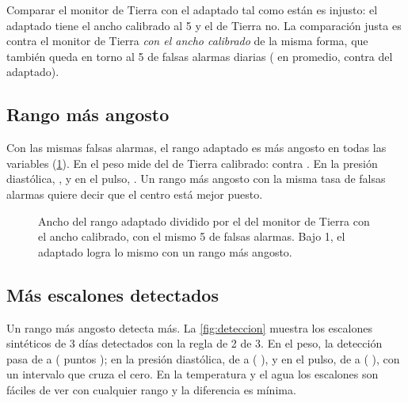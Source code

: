 Comparar el monitor de Tierra con el adaptado tal como están es injusto: el adaptado tiene el ancho calibrado al
5\pct{} y el de Tierra no. La comparación justa es contra el monitor de Tierra \emph{con el ancho calibrado} de la
misma forma, que también queda en torno al 5\pct{} de falsas alarmas diarias (\pct{} en
promedio, contra \pct{} del adaptado).

\subsection{Rango más angosto}

Con las mismas falsas alarmas, el rango adaptado es más angosto en todas las variables (\cref{fig:ancho}). En el peso
mide  del de Tierra calibrado:  contra
. En la presión diastólica, , y en el pulso,
. Un rango más angosto con la misma tasa de falsas alarmas quiere decir que el centro está
mejor puesto.

\begin{figure}[htbp]
\centering

\caption[Ancho del rango adaptado frente al de Tierra calibrado]{Ancho del rango adaptado dividido por el del monitor
de Tierra con el ancho calibrado, con el mismo 5\pct{} de falsas alarmas. Bajo 1, el adaptado logra lo mismo con un
rango más angosto.}
\label{fig:ancho}
\end{figure}

\subsection{Más escalones detectados}

Un rango más angosto detecta más. La \cref{fig:deteccion} muestra los escalones sintéticos de 3 días detectados con la
regla de 2 de 3. En el peso, la detección pasa de \pct{} a \pct{}
( puntos ); en la presión diastólica, de  a
\pct{} ( ), y en el pulso, de
 a \pct{} ( ), con
un intervalo que cruza el cero. En la temperatura y el agua los escalones son fáciles de ver con cualquier rango y la
diferencia es mínima.

